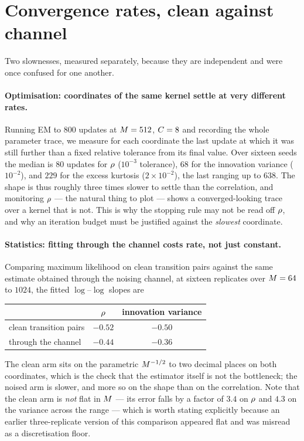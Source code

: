 \section{Convergence rates, clean against channel}
\label{app:rates}

Two slownesses, measured separately, because they are independent and were once confused for one
another.

\paragraph{Optimisation: coordinates of the same kernel settle at very different rates.} Running
EM to $800$ updates at $M=512$, $C=8$ and recording the whole parameter trace, we measure
for each coordinate the last update at which it was still further than a fixed relative tolerance
from its final value. Over sixteen seeds the median is $80$ updates for $\rho$ ($10^{-3}$
tolerance), $68$ for the innovation variance ($10^{-2}$), and $229$ for the excess kurtosis
($2\times10^{-2}$), the last ranging up to $638$. The shape is thus roughly three times slower to
settle than the correlation, and monitoring $\rho$ --- the natural thing to plot --- shows a
converged-looking trace over a kernel that is not. This is why the stopping rule may not be read
off $\rho$, and why an iteration budget must be justified against the \emph{slowest} coordinate.

\paragraph{Statistics: fitting through the channel costs rate, not just constant.} Comparing
maximum likelihood on clean transition pairs against the same estimate obtained through the
noising channel, at sixteen replicates over $M=64$ to $1024$, the fitted $\log$--$\log$ slopes
are

\begin{center}\small
\begin{tabular}{@{}lcc@{}}
\toprule
& $\rho$ & innovation variance \\
\midrule
clean transition pairs & $-0.52$ & $-0.50$ \\
through the channel    & $-0.44$ & $-0.36$ \\
\bottomrule
\end{tabular}
\end{center}

\noindent
The clean arm sits on the parametric $M^{-1/2}$ to two decimal places on both coordinates,
which is the check that the estimator itself is not the bottleneck; the noised arm is slower, and
more so on the shape than on the correlation. Note that the clean arm is \emph{not} flat in
$M$ --- its error falls by a factor of $3.4$ on $\rho$ and $4.3$ on the variance across the
range --- which is worth stating explicitly because an earlier three-replicate version of this
comparison appeared flat and was misread as a discretisation floor.

